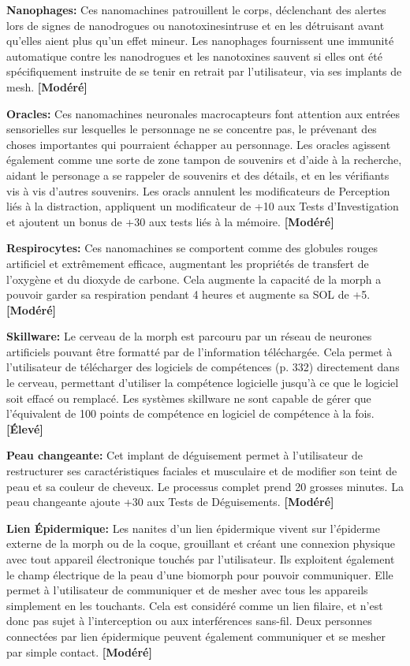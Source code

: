 \textbf{Nanophages:} Ces nanomachines patrouillent le corps, déclenchant des alertes lors de signes de nanodrogues ou nanotoxinesintruse et en les détruisant avant qu'elles aient plus qu'un effet mineur. Les nanophages fournissent une immunité automatique contre les nanodrogues et les nanotoxines sauvent si elles ont été spécifiquement instruite de se tenir en retrait par l'utilisateur, via ses implants de mesh. \textbf{[Modéré]} 

\textbf{Oracles:} Ces nanomachines neuronales macrocapteurs font attention aux entrées sensorielles sur lesquelles le personnage ne se concentre pas, le prévenant des choses importantes qui pourraient échapper au personnage. Les oracles agissent également comme une sorte de zone tampon de souvenirs et d'aide à la recherche, aidant le personage a se rappeler de souvenirs et des détails, et en les vérifiants vis à vis d'autres souvenirs. Les oracls annulent les modificateurs de Perception liés à la distraction, appliquent un modificateur de +10 aux Tests d'Investigation et ajoutent un bonus de +30 aux tests liés à la mémoire. \textbf{[Modéré]} 

\textbf{Respirocytes:} Ces nanomachines se comportent comme des globules rouges artificiel et extrêmement efficace, augmentant les propriétés de transfert de l'oxygène et du dioxyde de carbone. Cela augmente la capacité de la morph a pouvoir garder sa respiration pendant 4 heures et augmente sa SOL de +5. \textbf{[Modéré]} 

\textbf{Skillware:} Le cerveau de la morph est parcouru par un réseau de neurones artificiels pouvant être formatté par de l'information téléchargée. Cela permet à l'utilisateur de télécharger des logiciels de compétences (p. 332) directement dans le cerveau, permettant d'utiliser la compétence logicielle jusqu'à ce que le logiciel soit effacé ou remplacé. Les systèmes skillware ne sont capable de gérer que l'équivalent de 100 points de compétence en logiciel de compétence à la fois. \textbf{[Élevé]} 

\textbf{Peau changeante:} Cet implant de déguisement permet à l'utilisateur de restructurer ses caractéristiques faciales et musculaire et de modifier son teint de peau et sa couleur de cheveux. Le processus complet prend 20 grosses minutes. La peau changeante ajoute +30 aux Tests de Déguisements. \textbf{[Modéré]} 

\textbf{Lien Épidermique:} Les nanites d'un lien épidermique vivent sur l'épiderme externe de la morph ou de la coque, grouillant et créant une connexion physique avec tout appareil électronique touchés par l'utilisateur. Ils exploitent également le champ électrique de la peau d'une biomorph pour pouvoir communiquer. Elle permet à l'utilisateur de communiquer et de mesher avec tous les appareils simplement en les touchants. Cela est considéré comme un lien filaire, et n'est donc pas sujet à l'interception ou aux interférences sans-fil. Deux personnes connectées par lien épidermique peuvent également communiquer et se mesher par simple contact. \textbf{[Modéré]} 

